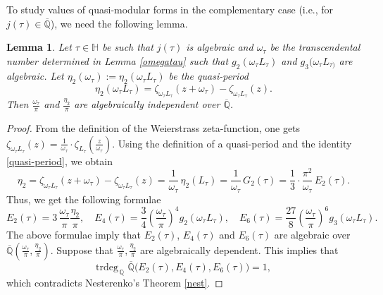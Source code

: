 \documentclass[11pt, reqno]{amsart}
\newtheorem{lemma}[theorem]{Lemma}
\begin{document}
To study values of quasi-modular forms in the complementary case (i.e., for $j(\tau)\in\overline{\mathbb{Q}}$), we need the following lemma.
\begin{lemma}\label{peri}
 Let $\tau\in \mathbb{H}$ be such that $j(\tau)$ is algebraic and $\omega_{\tau}$ be the transcendental number determined in Lemma \ref{omegatau} such that $g_2(\omega_{\tau}L_{\tau})$ and $g_3(\omega_{\tau}L_{\tau)}$ are algebraic. Let $\eta_2(\omega_{\tau}) := \eta_2(\omega_{\tau} L_{\tau})$ be the quasi-period 
 \begin{equation*}
     \eta_2( \omega_{\tau} L_{\tau}) = \zeta_{\omega_{\tau}L_{\tau}}(z+\omega_{\tau}) - \zeta_{\omega_{\tau}L_{\tau}}(z).
 \end{equation*}
 Then $\frac{\omega_\tau}{\pi}$ and $\frac{\eta_2}{\pi}$ are algebraically independent over $\overline{\mathbb{Q}}$. 
\end{lemma}
\begin{proof}
From the definition of the Weierstrass zeta-function, one gets
 $   
{\zeta}_{\omega_\tau L_\tau}(z)= \frac{1}{\omega_\tau}\cdot \zeta_{L_\tau}\left(\frac{z}{\omega_\tau}\right).
$ 
Using the definition of a quasi-period and the identity \eqref{quasi-period}, we obtain
$$
\eta_2= \zeta_{\omega_\tau L_\tau}(z+\omega_\tau)-\zeta_{\omega_\tau L_\tau}(z)= \frac{1}{\omega_\tau}\,\eta_2(L_\tau)=\frac{1}{\omega_\tau}\,G_2(\tau)= \frac{1}{3}\cdot\frac{\pi^2}{ \omega_\tau}\,E_2(\tau).
$$
Thus, we get the following formulae 
$$
E_2(\tau)=3\,\frac{\omega_\tau}{\pi}\frac{\eta_2}{\pi}, \quad E_4(\tau)=\frac{3}{4}\left(\frac{\omega_\tau}{\pi} \right)^4 g_2(\omega_\tau L_\tau),\quad E_6(\tau)=\frac{27}{8}\left(\frac{\omega_\tau}{\pi}\right)^6g_3(\omega_\tau L_\tau).$$
The above formulae imply that $E_2(\tau)$, $E_4(\tau)$ and $E_6(\tau)$ are algebraic over $\overline{\mathbb{Q}}\left(\frac{\omega_\tau}{\pi}, \frac{\eta_2}{\pi}\right)$. Suppose that $\frac{\omega_\tau}{\pi}, \frac{\eta_2}{\pi}$ are algebraically dependent. This implies that $$ \text{trdeg}_{\,\mathbb{Q}} \, \,\overline{\mathbb{Q}} \bigg(  E_2(\tau), E_4(\tau), E_6(\tau) \bigg)=1,$$ which contradicts Nesterenko's Theorem \ref{nest}.
\end{proof}
\end{document}
